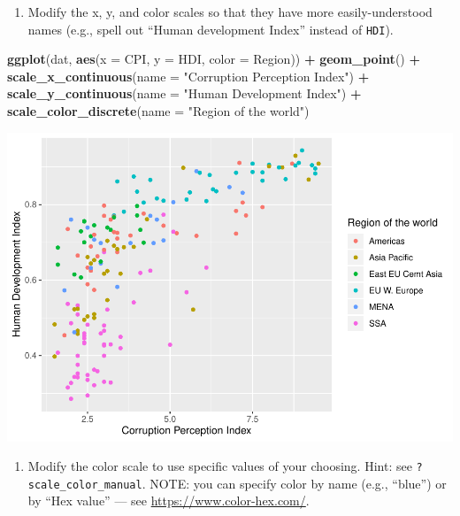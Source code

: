 \documentclass[]{book}
\newenvironment{Shaded}{\begin{snugshade}}{\end{snugshade}}
\newcommand{\DataTypeTok}[1]{\textcolor[rgb]{0.13,0.29,0.53}{#1}}
\newcommand{\KeywordTok}[1]{\textcolor[rgb]{0.13,0.29,0.53}{\textbf{#1}}}
\newcommand{\NormalTok}[1]{#1}
\newcommand{\OperatorTok}[1]{\textcolor[rgb]{0.81,0.36,0.00}{\textbf{#1}}}
\newcommand{\StringTok}[1]{\textcolor[rgb]{0.31,0.60,0.02}{#1}}
\providecommand{\tightlist}{%
  \setlength{\itemsep}{0pt}\setlength{\parskip}{0pt}}
\begin{document}
\begin{enumerate}
\def\labelenumi{\arabic{enumi}.}
\setcounter{enumi}{1}
\tightlist
\item
  Modify the x, y, and color scales so that they have more easily-understood names (e.g., spell out ``Human development Index'' instead of \texttt{HDI}).
\end{enumerate}

\begin{Shaded}
\begin{Highlighting}[]
\KeywordTok{ggplot}\NormalTok{(dat, }\KeywordTok{aes}\NormalTok{(}\DataTypeTok{x =}\NormalTok{ CPI, }\DataTypeTok{y =}\NormalTok{ HDI, }\DataTypeTok{color =}\NormalTok{ Region)) }\OperatorTok{+}
\StringTok{  }\KeywordTok{geom_point}\NormalTok{() }\OperatorTok{+}
\StringTok{  }\KeywordTok{scale_x_continuous}\NormalTok{(}\DataTypeTok{name =} \StringTok{"Corruption Perception Index"}\NormalTok{) }\OperatorTok{+}
\StringTok{  }\KeywordTok{scale_y_continuous}\NormalTok{(}\DataTypeTok{name =} \StringTok{"Human Development Index"}\NormalTok{) }\OperatorTok{+}
\StringTok{  }\KeywordTok{scale_color_discrete}\NormalTok{(}\DataTypeTok{name =} \StringTok{"Region of the world"}\NormalTok{)}
\end{Highlighting}
\end{Shaded}

\includegraphics{R/Rgraphics/figures/unnamed-chunk-190-1.pdf}

\begin{enumerate}
\def\labelenumi{\arabic{enumi}.}
\setcounter{enumi}{2}
\tightlist
\item
  Modify the color scale to use specific values of your choosing. Hint: see \texttt{?scale\_color\_manual}. NOTE: you can specify color by name (e.g., ``blue'') or by ``Hex value'' --- see \url{https://www.color-hex.com/}.
\end{enumerate}
\end{document}
